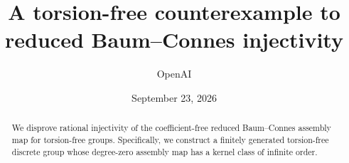\documentclass[11pt]{article}
\title{A torsion-free counterexample to reduced Baum--Connes injectivity}
\author{OpenAI}
\date{September 23, 2026}
\numberwithin{equation}{section}
\theoremstyle{definition}
\theoremstyle{remark}
\begin{document}
\maketitle
\begin{abstract}
We disprove rational injectivity of the coefficient-free reduced
Baum--Connes assembly map for torsion-free groups. Specifically, we construct
a finitely generated torsion-free discrete group whose degree-zero assembly
map has a kernel class of infinite order.
\end{abstract}

\clearpage
\tableofcontents
\clearpage










\end{document}
